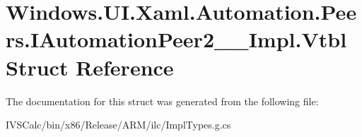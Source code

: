 \hypertarget{struct_windows_1_1_u_i_1_1_xaml_1_1_automation_1_1_peers_1_1_i_automation_peer2_____impl_1_1_vtbl}{}\section{Windows.\+U\+I.\+Xaml.\+Automation.\+Peers.\+I\+Automation\+Peer2\+\_\+\+\_\+\+Impl.\+Vtbl Struct Reference}
\label{struct_windows_1_1_u_i_1_1_xaml_1_1_automation_1_1_peers_1_1_i_automation_peer2_____impl_1_1_vtbl}


The documentation for this struct was generated from the following file\+:\begin{DoxyCompactItemize}
\item 
I\+V\+S\+Calc/bin/x86/\+Release/\+A\+R\+M/ilc/Impl\+Types.\+g.\+cs\end{DoxyCompactItemize}
